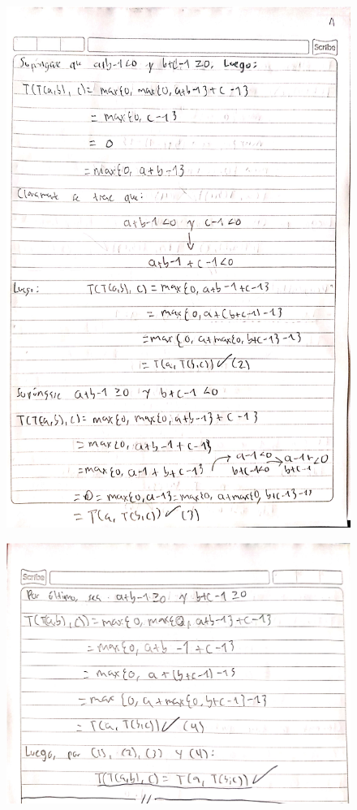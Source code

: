 \documentclass[fleqn]{article}
\begin{document}
\begin{enumerate}
\begin{itemize}
\begin{figure}[H]
       \end{figure}
       \begin{figure}[H]
         \centering
         \includegraphics[scale=.8]{figs/2b3}
       \end{figure}
       \begin{figure}[H]
         \centering
         \includegraphics[scale=.5]{figs/2b4}

\end{figure}
\end{itemize}
\end{enumerate}
\end{document}
